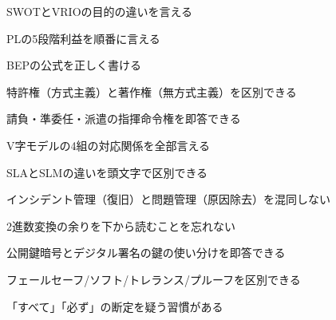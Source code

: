 
\begin{tatsaku}[試験前ミスチェック]
  \item SWOTとVRIOの目的の違いを言える
  \item PLの5段階利益を順番に言える
  \item BEPの公式を正しく書ける
  \item 特許権（方式主義）と著作権（無方式主義）を区別できる
  \item 請負・準委任・派遣の指揮命令権を即答できる
  \item V字モデルの4組の対応関係を全部言える
  \item SLAとSLMの違いを頭文字で区別できる
  \item インシデント管理（復旧）と問題管理（原因除去）を混同しない
  \item 2進数変換の余りを下から読むことを忘れない
  \item 公開鍵暗号とデジタル署名の鍵の使い分けを即答できる
  \item フェールセーフ/ソフト/トレランス/プルーフを区別できる
  \item 「すべて」「必ず」の断定を疑う習慣がある
\end{tatsaku}
